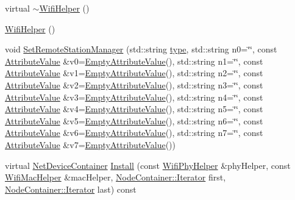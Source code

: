\begin{DoxyCompactItemize}
\item 
virtual \hyperlink{classns3_1_1WifiHelper_a02d703f33683f416413646ef95117afe}{$\sim$\+Wifi\+Helper} ()
\item 
\hyperlink{classns3_1_1WifiHelper_afcd1e26e0707db886f89f54a09aeb86d}{Wifi\+Helper} ()
\item 
void \hyperlink{classns3_1_1WifiHelper_a3d01b178aeb2de246ab5a3aa5638ce24}{Set\+Remote\+Station\+Manager} (std\+::string \hyperlink{visualizer-ideas_8txt_add98db9e15e2a58cf2b57623e7aa893a}{type}, std\+::string n0=\char`\"{}\char`\"{}, const \hyperlink{classns3_1_1AttributeValue}{Attribute\+Value} \&v0=\hyperlink{classns3_1_1EmptyAttributeValue}{Empty\+Attribute\+Value}(), std\+::string n1=\char`\"{}\char`\"{}, const \hyperlink{classns3_1_1AttributeValue}{Attribute\+Value} \&v1=\hyperlink{classns3_1_1EmptyAttributeValue}{Empty\+Attribute\+Value}(), std\+::string n2=\char`\"{}\char`\"{}, const \hyperlink{classns3_1_1AttributeValue}{Attribute\+Value} \&v2=\hyperlink{classns3_1_1EmptyAttributeValue}{Empty\+Attribute\+Value}(), std\+::string n3=\char`\"{}\char`\"{}, const \hyperlink{classns3_1_1AttributeValue}{Attribute\+Value} \&v3=\hyperlink{classns3_1_1EmptyAttributeValue}{Empty\+Attribute\+Value}(), std\+::string n4=\char`\"{}\char`\"{}, const \hyperlink{classns3_1_1AttributeValue}{Attribute\+Value} \&v4=\hyperlink{classns3_1_1EmptyAttributeValue}{Empty\+Attribute\+Value}(), std\+::string n5=\char`\"{}\char`\"{}, const \hyperlink{classns3_1_1AttributeValue}{Attribute\+Value} \&v5=\hyperlink{classns3_1_1EmptyAttributeValue}{Empty\+Attribute\+Value}(), std\+::string n6=\char`\"{}\char`\"{}, const \hyperlink{classns3_1_1AttributeValue}{Attribute\+Value} \&v6=\hyperlink{classns3_1_1EmptyAttributeValue}{Empty\+Attribute\+Value}(), std\+::string n7=\char`\"{}\char`\"{}, const \hyperlink{classns3_1_1AttributeValue}{Attribute\+Value} \&v7=\hyperlink{classns3_1_1EmptyAttributeValue}{Empty\+Attribute\+Value}())
\item 
virtual \hyperlink{classns3_1_1NetDeviceContainer}{Net\+Device\+Container} \hyperlink{classns3_1_1WifiHelper_a451b3d33fa1497c22f06c5451f57a127}{Install} (const \hyperlink{classns3_1_1WifiPhyHelper}{Wifi\+Phy\+Helper} \&phy\+Helper, const \hyperlink{classns3_1_1WifiMacHelper}{Wifi\+Mac\+Helper} \&mac\+Helper, \hyperlink{classns3_1_1NodeContainer_aa1a9f2d2b09bfef7d066d3974bca2cc4}{Node\+Container\+::\+Iterator} first, \hyperlink{classns3_1_1NodeContainer_aa1a9f2d2b09bfef7d066d3974bca2cc4}{Node\+Container\+::\+Iterator} last) const 

\end{DoxyCompactItemize}
